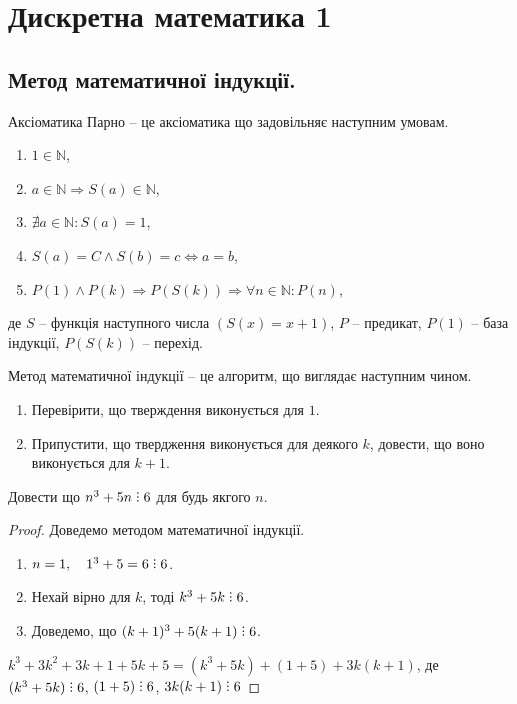 \chapter{Дискретна математика 1}
\minitoc


\section{Метод математичної індукції.}

\begin{definition}
    Аксіоматика Парно -- це аксіоматика що задовільняє наступним умовам.
    \begin{enumerate}
        \item $1 \in \mathbb{N}$,
        \item $a \in \mathbb{N} \Rightarrow S(a) \in \mathbb{N}$,
        \item $\nexists a \in \mathbb{N}: S(a) = 1$,
        \item $S(a) = C \wedge S(b) = c \Leftrightarrow a = b$,
        \item $P(1) \wedge P(k) \Rightarrow P(S(k)) \Rightarrow \forall n \in \mathbb{N}: P(n)$,
    \end{enumerate}
    
    де $S$ -- функція наступного числа $(S(x) = x + 1)$, $P$ -- предикат, $P(1)$ -- база індукції, $P(S(k))$ -- перехід.
\end{definition}

\begin{definition}
    Метод математичної індукції -- це алгоритм, що виглядає наступним чином.    
    \begin{enumerate}
        \item Перевірити, що тверждення виконується для $1$.
        \item Припустити, що твердження виконується для деякого $k$, довести, що воно виконується для $k+1$.
    \end{enumerate}
\end{definition}

\begin{example}
    Довести що $n^3 + 5n \divby 6$ для будь якгого $n$.
    \begin{proof}
        Доведемо методом математичної індукції.

        \begin{enumerate}
            \item $n = 1, \quad 1^3+5=6 \divby 6$.
            \item Нехай вірно для $k$, тоді $k^3 +5k \divby 6$.
            \item Доведемо, що $(k+1)^3 +5(k+1) \divby 6$.
        \end{enumerate}
    
        $k^3 + 3k^2 + 3k + 1 + 5k + 5 = (k^3+5k) + (1+5) + 3k(k+1)$,
        де $(k^3+5k) \divby 6$, $(1+5) \divby 6$, $3k(k+1) \divby 6$
    \end{proof}
\end{example}

